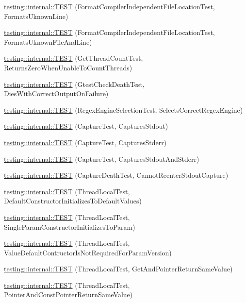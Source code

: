 \begin{DoxyCompactItemize}
\item 
\mbox{\hyperlink{namespacetesting_1_1internal_a0315a64a661f249628f2884080e0614f}{testing\+::internal\+::\+T\+E\+ST}} (Format\+Compiler\+Independent\+File\+Location\+Test, Formats\+Uknown\+Line)
\item 
\mbox{\hyperlink{namespacetesting_1_1internal_a8b9aee556f3dec6e67c35830ba55e0bd}{testing\+::internal\+::\+T\+E\+ST}} (Format\+Compiler\+Independent\+File\+Location\+Test, Formats\+Uknown\+File\+And\+Line)
\item 
\mbox{\hyperlink{namespacetesting_1_1internal_a5ad8299ae9325382f01b945f4f81711e}{testing\+::internal\+::\+T\+E\+ST}} (Get\+Thread\+Count\+Test, Returns\+Zero\+When\+Unable\+To\+Count\+Threads)
\item 
\mbox{\hyperlink{namespacetesting_1_1internal_afabff70df09a0e4fcda96dd36460c2b9}{testing\+::internal\+::\+T\+E\+ST}} (Gtest\+Check\+Death\+Test, Dies\+With\+Correct\+Output\+On\+Failure)
\item 
\mbox{\hyperlink{namespacetesting_1_1internal_a198f7132f76dd44d48dac54dc5d38fbb}{testing\+::internal\+::\+T\+E\+ST}} (Regex\+Engine\+Selection\+Test, Selects\+Correct\+Regex\+Engine)
\item 
\mbox{\hyperlink{namespacetesting_1_1internal_a0b658d88cea3a2fe6775b1b269c0204b}{testing\+::internal\+::\+T\+E\+ST}} (Capture\+Test, Captures\+Stdout)
\item 
\mbox{\hyperlink{namespacetesting_1_1internal_abbc9510a4f690912c32835213d95198f}{testing\+::internal\+::\+T\+E\+ST}} (Capture\+Test, Captures\+Stderr)
\item 
\mbox{\hyperlink{namespacetesting_1_1internal_a341ff65f3ca44b27fc51f03a9a05bee8}{testing\+::internal\+::\+T\+E\+ST}} (Capture\+Test, Captures\+Stdout\+And\+Stderr)
\item 
\mbox{\hyperlink{namespacetesting_1_1internal_a325a786fb22b87e5aa8d8f584b42ab09}{testing\+::internal\+::\+T\+E\+ST}} (Capture\+Death\+Test, Cannot\+Reenter\+Stdout\+Capture)
\item 
\mbox{\hyperlink{namespacetesting_1_1internal_af366e28e373f36480decc2ea586f48f0}{testing\+::internal\+::\+T\+E\+ST}} (Thread\+Local\+Test, Default\+Constructor\+Initializes\+To\+Default\+Values)
\item 
\mbox{\hyperlink{namespacetesting_1_1internal_a5a52dd578217050e621ebd2aace97a70}{testing\+::internal\+::\+T\+E\+ST}} (Thread\+Local\+Test, Single\+Param\+Constructor\+Initializes\+To\+Param)
\item 
\mbox{\hyperlink{namespacetesting_1_1internal_a6dffc8331590224259b60e855ad07d03}{testing\+::internal\+::\+T\+E\+ST}} (Thread\+Local\+Test, Value\+Default\+Contructor\+Is\+Not\+Required\+For\+Param\+Version)
\item 
\mbox{\hyperlink{namespacetesting_1_1internal_a0e7c2d58a313bec0821df19f44351d84}{testing\+::internal\+::\+T\+E\+ST}} (Thread\+Local\+Test, Get\+And\+Pointer\+Return\+Same\+Value)
\item 
\mbox{\hyperlink{namespacetesting_1_1internal_aaed45d6ba960f02e8d3d042c606bc98e}{testing\+::internal\+::\+T\+E\+ST}} (Thread\+Local\+Test, Pointer\+And\+Const\+Pointer\+Return\+Same\+Value)
\end{DoxyCompactItemize}
